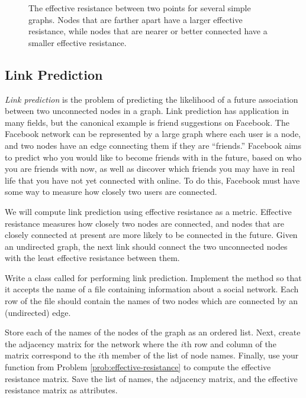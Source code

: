 \begin{center}
\begin{figure}[H]
\begin{tikzpicture}
\end{tikzpicture}
\caption{The effective resistance between two points for several simple graphs.
Nodes that are farther apart have a larger effective resistance, while nodes that are nearer or better connected have a smaller effective resistance.}
\label{fig:eff-res}
\end{figure}
\end{center}

\subsection*{Link Prediction} %

\emph{Link prediction} is the problem of predicting the likelihood of a future association between two unconnected nodes in a graph.
Link prediction has application in many fields, but the canonical example is friend suggestions on Facebook.
The Facebook network can be represented by a large graph where each user is a node, and two nodes have an edge connecting them if they are ``friends.''
Facebook aims to predict who you would like to become friends with in the future, based on who you are friends with now, as well as discover which friends you may have in real life that you have not yet connected with online.
To do this, Facebook must have some way to measure how closely two users are connected.

We will compute link prediction using effective resistance as a metric.
Effective resistance measures how closely two nodes are connected, and nodes that are closely connected at present are more likely to be connected in the future.
Given an undirected graph, the next link should connect the two unconnected nodes with the least effective resistance between them.

\begin{problem}
Write a class called  for performing link prediction.
Implement the  method so that it accepts the name of a  file containing information about a social network.
Each row of the file should contain the names of two nodes which are connected by an (undirected) edge.

Store each of the names of the nodes of the graph as an ordered list.
Next, create the adjacency matrix for the network where the $i$th row and column of the matrix correspond to the $i$th member of the list of node names.
Finally, use your function from Problem \ref{prob:effective-resistance} to compute the effective resistance matrix.
Save the list of names, the adjacency matrix, and the effective resistance matrix as attributes.
\end{problem}

